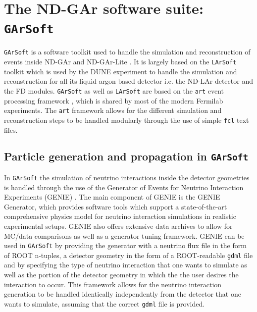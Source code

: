 \section{The ND-GAr software suite: \texttt{GArSoft}}
\label{Sec:GArSoft_Lite}
\texttt{GArSoft} is a software toolkit used to handle the simulation and reconstruction of events inside ND-GAr and ND-GAr-Lite \cite{garsoft}. It is largely based on the \texttt{LArSoft} toolkit \cite{Church:2013hea,LArSoft} which is used by the DUNE experiment to handle the simulation and reconstruction for all its liquid argon based detector i.e. the ND-LAr detector and the FD modules. \texttt{GArSoft} as well as \texttt{LArSoft} are based on the \texttt{art} event processing framework \cite{Green:2012gv}, which is shared by most of the modern Fermilab experiments. The \texttt{art} framework allows for the different simulation and reconstruction steps to be handled modularly through the use of simple \texttt{fcl} text files.

\subsection{Particle generation and propagation in \texttt{GArSoft}}
\label{Sec:GArSoft_PartGen}
In \texttt{GArSoft} the simulation of neutrino interactions inside the detector geometries is handled through the use of the Generator of Events for Neutrino Interaction Experiments (GENIE) \cite{Andreopoulos:2009rq}. The main component of GENIE is the GENIE Generator, which provides software tools which support a state-of-the-art comprehensive physics model for neutrino interaction simulations in realistic experimental setups. GENIE also offers extensive data archives to allow for MC/data comparisons as well as a generator tuning framework. GENIE can be used in \texttt{GArSoft} by providing the generator with a neutrino flux file in the form of ROOT \cite{Brun:1997pa} n-tuples, a detector geometry in the form of a ROOT-readable \texttt{gdml} file and by specifying the type of neutrino interaction that one wants to simulate as well as the portion of the detector geometry in which the the user desires the interaction to occur. This framework allows for the neutrino interaction generation to be handled identically independently from the detector that one wants to simulate, assuming that the correct \texttt{gdml} file is provided. 

